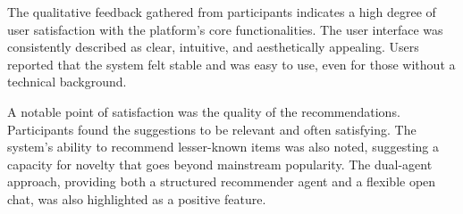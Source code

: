 The qualitative feedback gathered from participants indicates a high degree of user satisfaction with the platform's core functionalities. The user interface was consistently described as clear, intuitive, and aesthetically appealing. Users reported that the system felt stable and was easy to use, even for those without a technical background.

A notable point of satisfaction was the quality of the recommendations. Participants found the suggestions to be relevant and often satisfying. The system's ability to recommend lesser-known items was also noted, suggesting a capacity for novelty that goes beyond mainstream popularity. The dual-agent approach, providing both a structured recommender agent and a flexible open chat, was also highlighted as a positive feature.